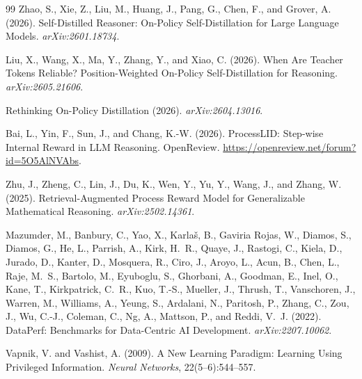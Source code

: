 \documentclass{article}
\begin{document}
\begin{thebibliography}{99}
 Zhao, S., Xie, Z., Liu, M., Huang, J., Pang, G.,
Chen, F., and Grover, A. (2026). Self-Distilled Reasoner: On-Policy
Self-Distillation for Large Language Models. \emph{arXiv:2601.18734}.

 Liu, X., Wang, X., Ma, Y., Zhang, Y., and Xiao, C.
(2026). When Are Teacher Tokens Reliable? Position-Weighted On-Policy
Self-Distillation for Reasoning. \emph{arXiv:2605.21606}.

 Rethinking On-Policy Distillation (2026).
\emph{arXiv:2604.13016}.

 Bai, L., Yin, F., Sun, J., and Chang, K.-W.
(2026). ProcessLID: Step-wise Internal Reward in LLM Reasoning. OpenReview.
\url{https://openreview.net/forum?id=5O5AlNVAbs}.

 Zhu, J., Zheng, C., Lin, J., Du, K., Wen, Y.,
Yu, Y., Wang, J., and Zhang, W. (2025). Retrieval-Augmented Process Reward
Model for Generalizable Mathematical Reasoning. \emph{arXiv:2502.14361}.

 Mazumder, M., Banbury, C., Yao, X.,
Karla\v{s}, B., Gaviria Rojas, W., Diamos, S., Diamos, G., He, L., Parrish,
A., Kirk, H.~R., Quaye, J., Rastogi, C., Kiela, D., Jurado, D., Kanter, D.,
Mosquera, R., Ciro, J., Aroyo, L., Acun, B., Chen, L., Raje, M.~S., Bartolo,
M., Eyuboglu, S., Ghorbani, A., Goodman, E., Inel, O., Kane, T., Kirkpatrick,
C.~R., Kuo, T.-S., Mueller, J., Thrush, T., Vanschoren, J., Warren, M.,
Williams, A., Yeung, S., Ardalani, N., Paritosh, P., Zhang, C., Zou, J., Wu,
C.-J., Coleman, C., Ng, A., Mattson, P., and Reddi, V.~J. (2022). DataPerf:
Benchmarks for Data-Centric AI Development. \emph{arXiv:2207.10062}.

 Vapnik, V. and Vashist, A. (2009). A New
Learning Paradigm: Learning Using Privileged Information. \emph{Neural
Networks}, 22(5--6):544--557.

\end{thebibliography}
\end{document}
